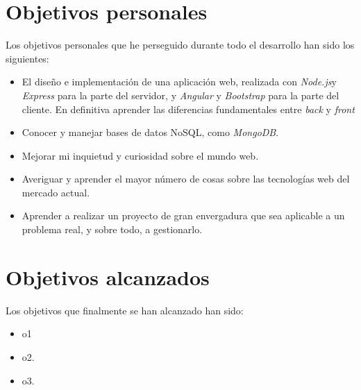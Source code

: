 \section{Objetivos personales}\label{objetivos-personales}
Los objetivos personales que he perseguido durante todo el desarrollo han sido los siguientes:
\begin{itemize}
\tightlist
\item
 El diseño e implementación de una aplicación web, realizada con \emph{Node.js}y \emph{Express} para la parte del
servidor, y \emph{Angular} y \emph{Bootstrap} para la parte del cliente.  En definitiva aprender las diferencias fundamentales entre \emph{back} y \emph{front}
\item
  Conocer y manejar bases de datos NoSQL, como \emph{MongoDB}.
\item
  Mejorar mi inquietud y curiosidad sobre el mundo web. 
\item
  Averiguar y aprender el mayor número de cosas sobre las tecnologías web del mercado actual. 
\item
  Aprender a realizar un proyecto de gran envergadura que sea aplicable a un problema real, y sobre todo, a gestionarlo.
\end{itemize}

\section{Objetivos alcanzados}\label{objetivos-alcanzados}
Los objetivos que finalmente se han alcanzado han sido: 
\begin{itemize}
\tightlist
\item
  o1
\item
  o2. 
\item
  o3.
\end{itemize}
